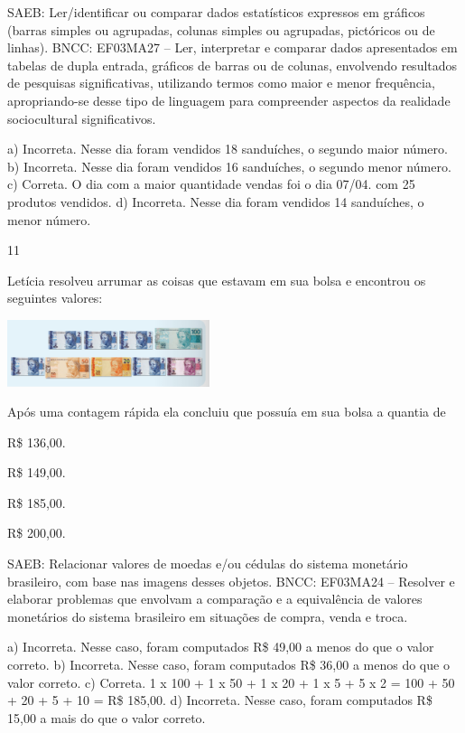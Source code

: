 {\begin{escolha}
{SAEB: Ler/identificar ou comparar dados estatísticos
expressos em gráficos (barras simples ou agrupadas, colunas simples ou
agrupadas, pictóricos ou de linhas).
BNCC: EF03MA27 -- Ler, interpretar e comparar dados apresentados em tabelas de dupla entrada,
gráficos de barras ou de colunas, envolvendo resultados de pesquisas significativas, utilizando
termos como maior e menor frequência, apropriando-se desse tipo de linguagem para
compreender aspectos da realidade sociocultural significativos.

a) Incorreta. Nesse dia foram vendidos 18 sanduíches, o segundo maior número.
b) Incorreta. Nesse dia foram vendidos 16 sanduíches, o segundo menor número.
c) Correta. O dia com a maior quantidade vendas foi o dia 07/04. com 25 produtos vendidos.
d) Incorreta. Nesse dia foram vendidos 14 sanduíches, o menor número.

\num{11}

Letícia resolveu arrumar as coisas que estavam em sua bolsa e encontrou os seguintes valores:

\includegraphics[width=2.33354in,height=0.76673in]{media/image125.png}

Após uma contagem rápida ela concluiu que possuía em sua bolsa a quantia de

\begin{escolha}

\item
  R\$ 136,00.
\item
  R\$ 149,00.
\item
  R\$ 185,00.
\item
  R\$ 200,00.
\end{escolha}

SAEB: Relacionar valores de moedas e/ou cédulas do sistema monetário brasileiro, com base nas imagens desses objetos.
BNCC: EF03MA24 -- Resolver e elaborar problemas que envolvam a comparação e a equivalência de
valores monetários do sistema brasileiro em situações de compra, venda e troca.

a) Incorreta. Nesse caso, foram computados R\$ 49,00 a menos do que o valor correto.
b) Incorreta. Nesse caso, foram computados R\$ 36,00 a menos do que o valor correto.
c) Correta. 1 x 100 + 1 x 50 + 1 x 20 + 1 x 5 + 5 x 2 = 100 + 50 + 20 + 5 + 10 = R\$ 185,00.
d) Incorreta. Nesse caso, foram computados R\$ 15,00 a mais do que o valor correto.

}
\end{escolha}}
